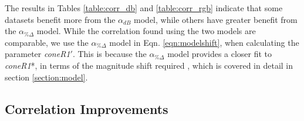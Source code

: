 

The results in Tables \ref{table:corr_db} and \ref{table:corr_rgb} indicate that some datasets benefit more from the $\alpha_{dB}$ model, while others have greater benefit from the $\alpha_{\%\Delta}$ model. While the correlation found using the two models are comparable, we use the $\alpha_{\%\Delta}$ model in Eqn. \ref{eqn:modelshift}, when calculating the parameter \textit{coneR1}$'$. This is because the $\alpha_{\%\Delta}$ model provides a closer fit to \textit{coneR1}*, in terms of the magnitude shift required , which is covered in detail in section \ref{section:model}.

\FloatBarrier
\subsection{Correlation Improvements} \label{section:corrimprovements}

